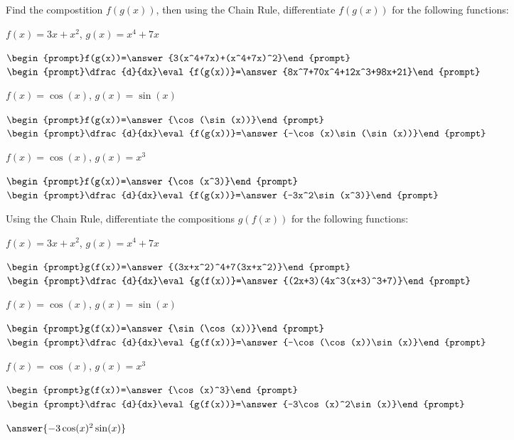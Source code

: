 \documentclass{ximera}
\begin{document}
\begin{question}

Find the compostition $f(g(x))$, then using the Chain Rule, differentiate $f(g(x))$ for the following functions:

$f(x) = 3x+x^2$, $g(x) = x^4+7x$

$\begin{prompt}f(g(x))=\answer{3(x^4+7x)+(x^4+7x)^2}\end{prompt}$
$\begin{prompt}\dfrac{d}{dx}\eval{f(g(x))}=\answer{8x^7+70x^4+12x^3+98x+21}\end{prompt}$

$f(x) = \cos(x)$, $g(x) = \sin(x)$

$\begin{prompt}f(g(x))=\answer{\cos(\sin(x))}\end{prompt}$
$\begin{prompt}\dfrac{d}{dx}\eval{f(g(x))}=\answer{-\cos(x)\sin(\sin(x))}\end{prompt}$

$f(x) = \cos(x)$, $g(x) = x^3$

$\begin{prompt}f(g(x))=\answer{\cos(x^3)}\end{prompt}$
$\begin{prompt}\dfrac{d}{dx}\eval{f(g(x))}=\answer{-3x^2\sin(x^3)}\end{prompt}$

\end{question}

\begin{question}

Using the Chain Rule, differentiate the compositions $g(f(x))$ for the following functions:

$f(x) = 3x+x^2$, $g(x) = x^4+7x$

$\begin{prompt}g(f(x))=\answer{(3x+x^2)^4+7(3x+x^2)}\end{prompt}$
$\begin{prompt}\dfrac{d}{dx}\eval{g(f(x))}=\answer{(2x+3)(4x^3(x+3)^3+7)}\end{prompt}$

$f(x) = \cos(x)$, $g(x) = \sin(x)$

$\begin{prompt}g(f(x))=\answer{\sin(\cos(x))}\end{prompt}$
$\begin{prompt}\dfrac{d}{dx}\eval{g(f(x))}=\answer{-\cos(\cos(x))\sin(x)}\end{prompt}$

$f(x) = \cos(x)$, $g(x) = x^3$

$\begin{prompt}g(f(x))=\answer{\cos(x)^3}\end{prompt}$
$\begin{prompt}\dfrac{d}{dx}\eval{g(f(x))}=\answer{-3\cos(x)^2\sin(x)}\end{prompt}$

$\answer{-3\cos(x)^2\sin(x)}$

\end{question}
\end{document}
